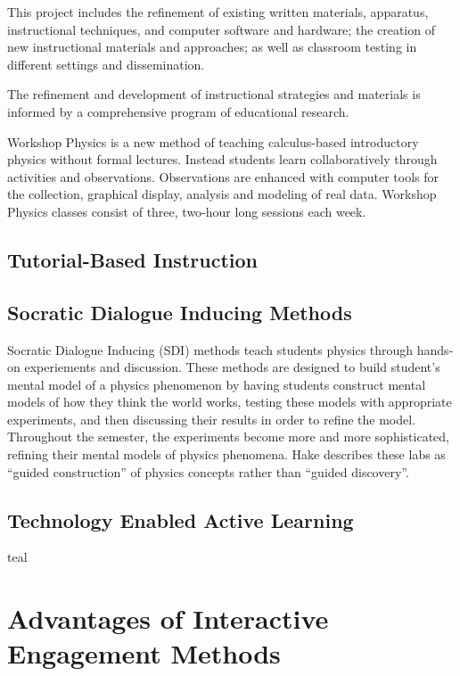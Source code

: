 This project includes the refinement of existing written materials, apparatus, instructional techniques, and computer software and hardware; the creation of new instructional materials and approaches; as well as classroom testing in different settings and dissemination.

The refinement and development of instructional strategies and materials is informed by a comprehensive program of educational research.

Workshop Physics is a new method of teaching calculus-based introductory physics without formal lectures. Instead students learn collaboratively through activities and observations. Observations are enhanced with computer tools for the collection, graphical display, analysis and modeling of real data. Workshop Physics classes consist of three, two-hour long sessions each week.

\subsection*{Tutorial-Based Instruction}

\subsection*{Socratic Dialogue Inducing Methods}

Socratic Dialogue Inducing (SDI) methods teach students physics through hands-on experiements and discussion. These methods are designed to build student's mental model of a physics phenomenon by having students construct mental models of how they think the world works, testing these models with appropriate experiments, and then discussing their results in order to refine the model. Throughout the semester, the experiments become more and more sophisticated, refining their mental models of physics phenomena. Hake describes these labs as ``guided construction'' of physics concepts rather than ``guided discovery''\cite{hake1992}.

\subsection*{Technology Enabled Active Learning}

\gls{teal}








\section{Advantages of Interactive Engagement Methods}

